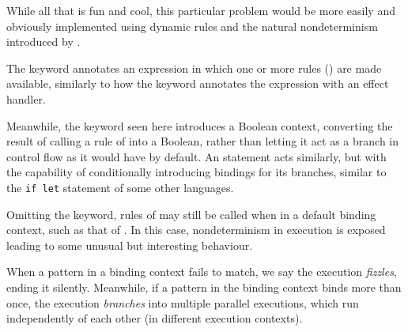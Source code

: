 While all that is fun and cool, this particular problem would be
more easily and obviously implemented using dynamic rules
and the natural nondeterminism introduced by \Law{}.


The  keyword annotates an expression in which one or more
rules () are made available, similarly to how the 
keyword annotates the expression with an effect handler.

Meanwhile, the  keyword seen here introduces a Boolean context,
converting the result of calling a rule of \Law{} into a Boolean,
rather than letting it act as a branch in control flow as it would
have by default. An  statement acts similarly, but with the
capability of conditionally introducing bindings for its branches,
similar to the \texttt{if let} statement of some other languages.


Omitting the  keyword, rules of \Law{} may still be called
when in a default binding context, such as that of . In this case,
nondeterminism in execution is exposed leading to some unusual but
interesting behaviour.

When a pattern in a binding context fails to match, we say the
execution \emph{fizzles}, ending it silently. Meanwhile, if a pattern in
the binding context binds more than once, the execution \emph{branches} into
multiple parallel executions, which run independently of each other
(in different execution contexts).
